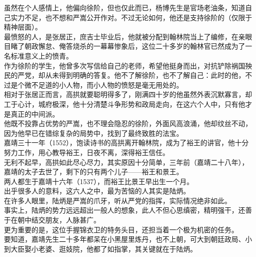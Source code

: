 \begin{multicols}{\theparacolNo}
虽然在个人感情上，他偏向徐阶，但也仅此而已，杨博先生是官场老油条，知道自己实力不足，也不想和严嵩公开作对。不过无论如何，他还是支持徐阶的（仅限于精神层面）。\\

最愤怒的人，是张居正，庶吉士毕业后，他就被分配到翰林院当上了编修，在亲眼目睹了朝政懈怠、俺答烧杀的一幕幕惨象后，这位二十多岁的翰林官已然成为了一名标准意义上的愤青。\\

作为徐阶的学生，他曾多次写信给自己的老师，希望他挺身而出，对抗铲除祸国殃民的严党，却从未得到明确的答复。他不了解徐阶，也不了解自己：此时的他，不过是个微不足道的小人物，而小人物的愤怒是毫无用处的。\\

相对于张居正而言，高拱就要聪明得多了，刚满四十岁的他虽然外表沉默寡言，却工于心计，城府极深，他十分清楚斗争形势和政局走向，在这六个人中，只有他才是真正的中间派。\\

他既不投靠占优势的严嵩，也不理会隐忍的徐阶，外面风高浪涌，他却纹丝不动，因为他早已在错综复杂的局势中，找到了最终致胜的法宝。\\

嘉靖三十一年（1552），饱读诗书的高拱离开翰林院，成为了裕王的讲官，他十分努力工作，用心教导裕王，日夜不离，深得裕王信任。\\

无利不起早，高拱如此尽心尽力，其实原因十分简单，三年前（嘉靖二十八年），嘉靖的太子去世了，剩下的只有两个儿子——裕王和景王。\\

两人都生于嘉靖十六年（1537），而裕王比景王早出生一个月。\\

出乎很多人的意料，这六人之中，最为苦恼的人其实是陆炳。\\

在许多人眼里，陆炳是严嵩的爪牙，听从严党的指挥，实际情况绝非如此。\\

事实上，陆炳的势力远远超出一般人的想象，此人不但心思缜密，精明强干，还善于在朝中结交朋友，人脉甚广。\\

更为重要的是，这位手握锦衣卫的特务头目，还担当着一个极为机密的任务。\\

要知道，嘉靖先生二十多年都呆在小黑屋里炼丹，也不上朝，可大到朝廷政局、小到大臣娶小老婆、逛妓院，他都了如指掌，其关键就在于陆炳。\\


\end{multicols}
